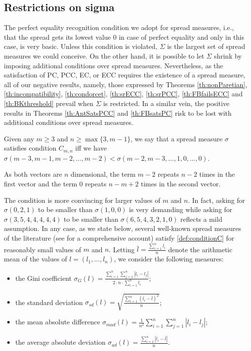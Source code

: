 \documentclass[version=3.21, pagesize, twoside=off, bibliography=totoc, DIV=calc, fontsize=12pt, a4paper]{scrartcl}
\begin{document}
\subsection{Restrictions on sigma}
\label{sec:RestrictionOnSigma}
The perfect equality recognition condition we adopt for spread measures, i.e., that the spread gets its lowest value $0$ in case of perfect equality and only in this case, is very basic. Unless this condition is violated, $\Sigma$ is the largest set of spread measures we could conceive. On the other hand, it is possible to let $\Sigma$ shrink by imposing additional conditions over spread measures. Nevertheless, as the satisfaction of PC, PCC, EC, or ECC requires the existence of a spread measure, all of our negative results, namely, those expressed by Theorems \ref{th:nonParetian}, \ref{th:incompatibility}, \ref{th:condorcet}, \ref{th:srECC}, \ref{th:srPCC}, \ref{th:FBfailsECC} and \ref{th:BKthreshold} prevail when $\Sigma$ is restricted. In a similar vein, the positive results in Theorems \ref{th:AntSatsPCC} and \ref{th:FBsatsPC} risk to be lost with additional conditions over spread measures.

\begin{definition}
	\label{def:conditionC}
	Given any $m\geq3$ and $n\geq \max\{3,m-1\}$, we say that a spread measure $\sigma$ satisfies condition $C_{m,n}$ iff we have $\sigma(m-3, m-1, m-2, \dots, m-2) < \sigma(m-2, m-3, \dots, 1, 0, \dots, 0)$.
\end{definition}

As both vectors are $n$ dimensional, the term $m-2$ repeats $n-2$ times in the first vector and the term $0$ repeats $n-m+2$ times in the second vector.

The condition is more convincing for larger values of $m$ and $n$. In fact, asking for $\sigma(0,2,1)$ to be smaller than $\sigma(1,0,0)$ is very demanding while asking for $\sigma(3,5,4,4,4,4,4)$ to be smaller than $\sigma(6,5,4,3,2,1,0)$ reflects a mild assumption. In any case, as we state below, several well-known spread measures of the literature (see \citet{Allison1978} for a comprehensive account) satisfy \cref{def:conditionC} for reasonably small values of $m$ and $n$. Letting $\bar{l}=\frac{\sum_{i=1}^{n}l_i}{n}$ denote the arithmetic mean of the values of $l = (l_1, …, l_n)$, we consider the following measures:

\begin{itemize}
	\item the Gini coefficient $\sigma_{G}(l)= \frac{\sum_{i=1}^{n}\sum_{j=1}^{n}|l_i-l_j|}{2 \cdot n \cdot \sum_{i=1}^{n} l_i}$;
	\item the standard deviation $\sigma_{sd}(l)= \sqrt{\frac{\sum_{i=1}^{n}(l_i-\bar{l})^2}{n}}$;
	\item the mean absolute difference $\sigma_{mad}(l)= \frac{1}{n^2} \sum_{i=1}^{n}\sum_{j=1}^{n}|l_i-l_j|$;
	\item the average absolute deviation $\sigma_{ad}(l)= \frac{\sum_{i=1}^{n}|l_i-\bar{l}|}{n}$.
\end{itemize} 
\end{document}
